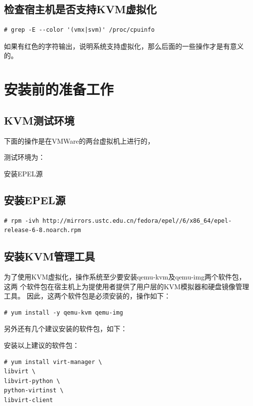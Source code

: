 \subsection{检查宿主机是否支持KVM虚拟化}
\label{sec:checkIfSupportKVM}

\begin{verbatim}
# grep -E --color '(vmx|svm)' /proc/cpuinfo
\end{verbatim}

如果有红色的字符输出，说明系统支持虚拟化，那么后面的一些操作才是有意义的。

\section{安装前的准备工作}
\label{sec:kvmPrepare}

\subsection{KVM测试环境}
\label{sec:testEnv}

下面的操作是在VMWare的两台虚拟机上进行的，

测试环境为：

安装EPEL源

\subsection{安装EPEL源}
\label{sec:InstallEpel}

\begin{verbatim}
# rpm -ivh http://mirrors.ustc.edu.cn/fedora/epel//6/x86_64/epel-release-6-8.noarch.rpm
\end{verbatim}

\subsection{安装KVM管理工具}
\label{sec:InstallKvmManager}

为了使用KVM虚拟化，操作系统至少要安装qemu-kvm及qemu-img两个软件包，这两
个软件包在宿主机上为提使用者提供了用户层的KVM模拟器和硬盘镜像管理工具。
因此，这两个软件包是必须安装的，操作如下：

\begin{verbatim}
# yum install -y qemu-kvm qemu-img
\end{verbatim}

另外还有几个建议安装的软件包，如下：

安装以上建议的软件包：

\begin{verbatim}
# yum install virt-manager \
libvirt \
libvirt-python \
python-virtinst \
libvirt-client
\end{verbatim}

